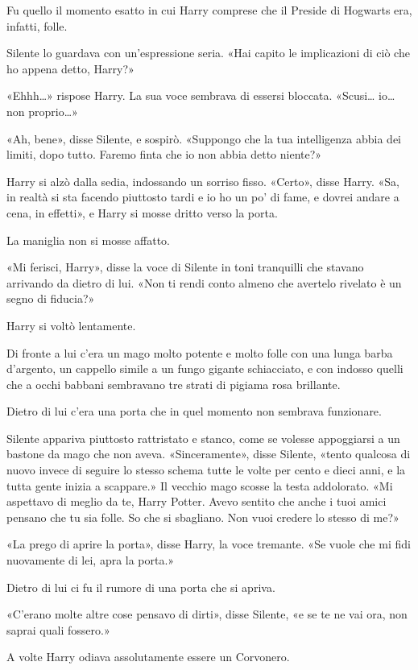 Fu quello il momento esatto in cui Harry comprese che il Preside di Hogwarts era, infatti, folle.

Silente lo guardava con un’espressione seria. «Hai capito le implicazioni di ciò che ho appena detto, Harry?»

«Ehhh…» rispose Harry. La sua voce sembrava di essersi bloccata. «Scusi… io… non proprio…»

«Ah, bene», disse Silente, e sospirò. «Suppongo che la tua intelligenza abbia dei limiti, dopo tutto. Faremo finta che io non abbia detto niente?»

Harry si alzò dalla sedia, indossando un sorriso fisso. «Certo», disse Harry. «Sa, in realtà si sta facendo piuttosto tardi e io ho un po’ di fame, e dovrei andare a cena, in effetti», e Harry si mosse dritto verso la porta.

La maniglia non si mosse affatto.

«Mi ferisci, Harry», disse la voce di Silente in toni tranquilli che stavano arrivando da dietro di lui. «Non ti rendi conto almeno che avertelo rivelato è un segno di fiducia?»

Harry si voltò lentamente.

Di fronte a lui c’era un mago molto potente e molto folle con una lunga barba d’argento, un cappello simile a un fungo gigante schiacciato, e con indosso quelli che a occhi babbani sembravano tre strati di pigiama rosa brillante.

Dietro di lui c’era una porta che in quel momento non sembrava funzionare.

Silente appariva piuttosto rattristato e stanco, come se volesse appoggiarsi a un bastone da mago che non aveva. «Sinceramente», disse Silente, «tento qualcosa di nuovo invece di seguire lo stesso schema tutte le volte per cento e dieci anni, e la tutta gente inizia a scappare.» Il vecchio mago scosse la testa addolorato. «Mi aspettavo di meglio da te, Harry Potter. Avevo sentito che anche i tuoi amici pensano che tu sia folle. So che si sbagliano. Non vuoi credere lo stesso di me?»

«La prego di aprire la porta», disse Harry, la voce tremante. «Se vuole che mi fidi nuovamente di lei, apra la porta.»

Dietro di lui ci fu il rumore di una porta che si apriva.

«C’erano molte altre cose pensavo di dirti», disse Silente, «e se te ne vai ora, non saprai quali fossero.»

A volte Harry odiava assolutamente essere un Corvonero.

